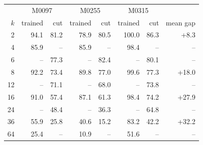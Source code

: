 \begin{tabular}{rrrrrrrr@{}}
\toprule
 & \multicolumn{2}{c}{M0097} & \multicolumn{2}{c}{M0255} & \multicolumn{2}{c}{M0315} & \\
$k$ & trained & cut & trained & cut & trained & cut & mean gap \\
\midrule
2 & 94.1 & 81.2 & 78.9 & 80.5 & 100.0 & 86.3 & +8.3 \\
4 & 85.9 & -- & 85.9 & -- & 98.4 & -- & -- \\
6 & -- & 77.3 & -- & 82.4 & -- & 80.1 & -- \\
8 & 92.2 & 73.4 & 89.8 & 77.0 & 99.6 & 77.3 & +18.0 \\
12 & -- & 71.1 & -- & 68.0 & -- & 73.8 & -- \\
16 & 91.0 & 57.4 & 87.1 & 61.3 & 98.4 & 74.2 & +27.9 \\
24 & -- & 48.4 & -- & 36.3 & -- & 64.8 & -- \\
36 & 55.9 & 25.8 & 40.6 & 15.2 & 83.2 & 42.2 & +32.2 \\
64 & 25.4 & -- & 10.9 & -- & 51.6 & -- & -- \\
\bottomrule
\end{tabular}
